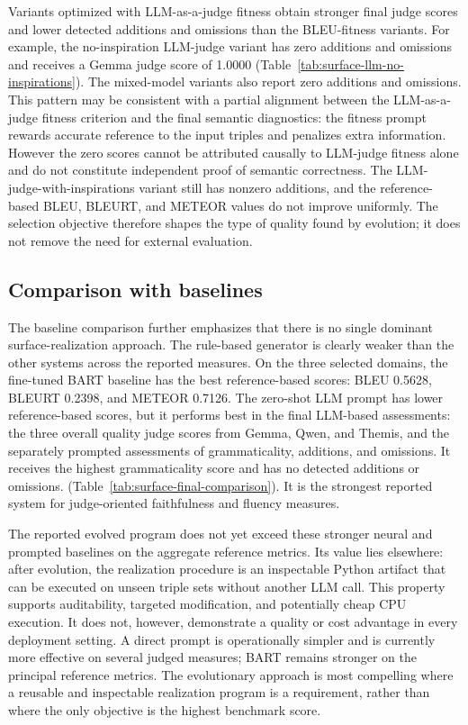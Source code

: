 Variants optimized with LLM-as-a-judge fitness obtain stronger final judge
scores and lower detected additions and omissions than the BLEU-fitness
variants. For example, the no-inspiration LLM-judge variant has zero additions
and omissions and receives a Gemma judge score of 1.0000
(Table~\ref{tab:surface-llm-no-inspirations}). The mixed-model variants also
report zero additions and omissions. This pattern may be consistent with a partial 
alignment between the LLM-as-a-judge fitness criterion and the final semantic 
diagnostics: the fitness prompt rewards accurate reference to the input triples and 
penalizes extra information. However the zero scores 
cannot be attributed causally to LLM-judge fitness alone and do not 
constitute independent proof of semantic correctness. The
LLM-judge-with-inspirations variant still has nonzero additions, and the
reference-based BLEU, BLEURT, and METEOR values do not improve uniformly. The
selection objective therefore shapes the type of quality found by evolution;
it does not remove the need for external evaluation.

\subsection{Comparison with baselines}

The baseline comparison further emphasizes that there is no single dominant
surface-realization approach. The rule-based generator is clearly weaker than
the other systems across the reported measures. On the three selected domains,
the fine-tuned BART baseline has the best reference-based scores: BLEU 0.5628,
BLEURT 0.2398, and METEOR 0.7126. The zero-shot LLM prompt has lower reference-based 
scores, but it performs best in the final LLM-based assessments: the three 
overall quality judge scores from Gemma, Qwen, and Themis, and the separately prompted 
assessments of grammaticality, additions, and omissions. It receives the highest 
grammaticality score and has no detected additions or omissions.
(Table~\ref{tab:surface-final-comparison}). It is the strongest
reported system for judge-oriented faithfulness and fluency measures.

The reported evolved program does not yet exceed these stronger neural and
prompted baselines on the aggregate reference metrics. Its value lies elsewhere:
after evolution, the realization procedure is an inspectable Python artifact
that can be executed on unseen triple sets without another LLM call. This
property supports auditability, targeted modification, and potentially cheap
CPU execution. It does not, however, demonstrate a quality or cost advantage in
every deployment setting. A direct prompt is operationally simpler and is
currently more effective on several judged measures; BART remains stronger on
the principal reference metrics. The evolutionary approach is most compelling
where a reusable and inspectable realization program is a requirement, rather
than where the only objective is the highest benchmark score.

